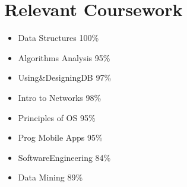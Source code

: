 \documentclass[letterpaper,11pt]{article}
\makeatletter
\newcommand{\resumeItem}[1]{
  \item\small{
    {#1 \vspace{-2pt}}
  }
}
\newcommand{\resumeSubheading}[4]{
  \vspace{-2pt}\item
    \begin{tabular*}{1.0\textwidth}[t]{l@{\extracolsep{\fill}}r}
      \textbf{#1} & \textbf{\small #2} \\
      \textit{\small#3} & \textit{\small #4} \\
    \end{tabular*}\vspace{-7pt}
}
\newcommand{\resumeSubHeadingListStart}{\begin{itemize}[leftmargin=0.0in, label={}]}
\newcommand{\resumeSubHeadingListEnd}{\end{itemize}}
\newcommand{\resumeItemListStart}{\begin{itemize}}
\newcommand{\resumeItemListEnd}{\end{itemize}\vspace{-5pt}}
\makeatother
\begin{document}
\section{Relevant Coursework}
        \begin{multicols}{4}
            \begin{itemize}[itemsep=-5pt, parsep=3pt]
                \item\small Data Structures 100\%
                \item Algorithms Analysis 95\%
                \item Using\&DesigningDB 97\%
                \item Intro to Networks 98\%
                \item Principles of OS 95\%
                \item Prog Mobile Apps 95\%
                \item SoftwareEngineering 84\%
                \item Data Mining 89\%
            \end{itemize}
        \end{multicols}
        \vspace*{2.0\multicolsep}



\end{document}
